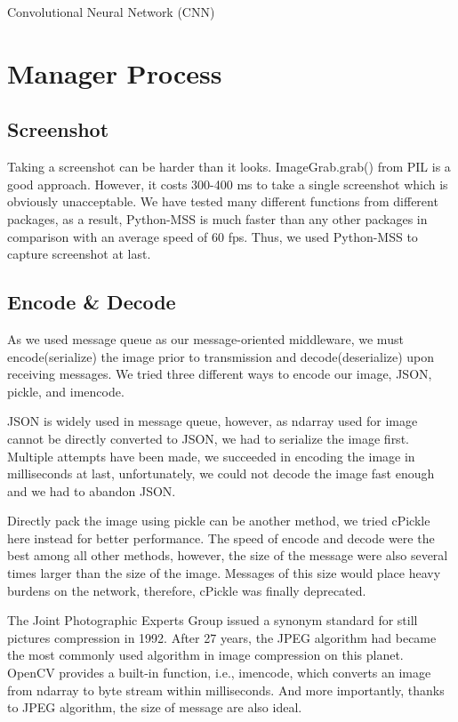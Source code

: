 \documentclass[runningheads]{llncs}
\begin{document}
Convolutional Neural Network (CNN) 


\section{Manager Process}
\subsection{Screenshot}
Taking a screenshot can be harder than it looks. 
ImageGrab.grab() from PIL is a good approach. However, 
it costs 300-400 ms to take a single screenshot which is 
obviously unacceptable. We have tested many different 
functions from different packages, as a result, Python-MSS 
is much faster than any other packages in comparison with 
an average speed of 60 fps. Thus, we used Python-MSS to 
capture screenshot at last. 

\subsection{Encode \& Decode}
As we used message queue as our message-oriented middleware, 
we must encode(serialize) the image prior to transmission 
and decode(deserialize) upon receiving messages. We tried 
three different ways to encode our image, JSON, pickle, 
and imencode. 

JSON is widely used in message queue, however, as ndarray 
used for image cannot be directly converted to JSON, we had 
to serialize the image first. Multiple attempts have been 
made, we succeeded in encoding the image in milliseconds at 
last, unfortunately, we could not decode the image fast 
enough and we had to abandon JSON. 

Directly pack the image using pickle can be another method, 
we tried cPickle here instead for better performance. The 
speed of encode and decode were the best among all other 
methods, however, the size of the message were also several 
times larger than the size of the image. Messages of this 
size would place heavy burdens on the network, therefore, 
cPickle was finally deprecated. 

The Joint Photographic Experts Group issued a synonym 
standard for still pictures compression in 1992. After 
27 years, the JPEG algorithm had became the most commonly 
used algorithm in image compression on this planet. OpenCV 
provides a built-in function, i.e., imencode, which 
converts an image from ndarray to byte stream within 
milliseconds. And more importantly, thanks to JPEG 
algorithm, the size of message are also ideal. 
\end{document}
